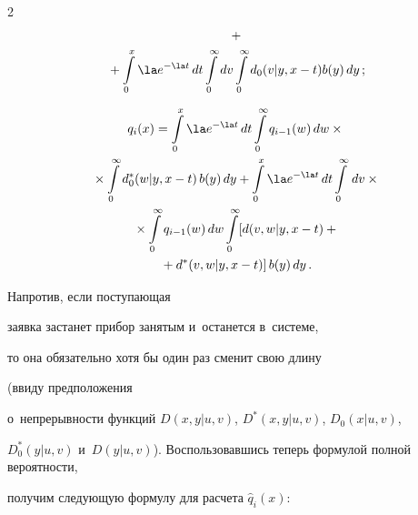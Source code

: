 \begin{multicols}{2}
\begin{multline*}
+{}\\


{}+


\int\limits_0^x \la e^{-\la t}\,dt


\int\limits_0^\infty


dv \int\limits_0^\infty d_0(v|y,x-t) b(y)\, dy\,;


\end{multline*}





\vspace*{-12pt}





\noindent


\begin{multline*}


{q}_i(x)= \int\limits_0^x \la e^{-\la t}\,dt


\int\limits_0^\infty {q}_{i-1}(w) \, dw\times{}\\


{}\times


\int\limits_0^\infty d^*_0(w|y,x-t)\, b(y)\, dy


+


\int\limits_0^x \la e^{-\la t}\,dt \int\limits_0^\infty \, dv\times{}\\


{}\times


\int\limits_0^\infty {q}_{i-1}(w) \, dw


\int\limits_0^\infty [d(v,w|y,x-t)+{}\\


{}+d^*(v,w|y,x-t)]\, b(y)\, dy\,.


\end{multline*}


Напротив, если поступающая


заявка застанет прибор занятым и~останется в~системе,


то она обязательно хотя бы один раз сменит свою длину\linebreak


 (ввиду предположения


о~непрерывности функций $D(x,y|u,v)$, $D^*(x,y|u,v)$, $D_0(x|u,v)$,


$D_0^*(y|u,v)$ и~$D(y|u,v)$). Воспользовавшись теперь формулой полной вероятности,


получим следующую формулу для расчета ${\widehat{q}_i(x)}$:


\begin{align*}



\end{align*}
\end{multicols}
